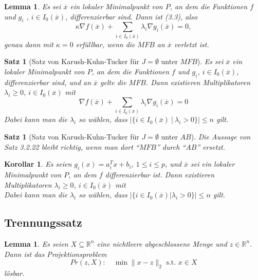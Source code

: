 \documentclass[11pt]{scrreprt}
\newcounter{thm}
\theoremstyle{thmstyle}
\numberwithin{thm}{section}
\newtheorem{korollar}[thm]{Korollar}
\newtheorem{lemma}[thm]{Lemma}
\newtheorem{satz}[thm]{Satz}
\begin{document}
\setcounter{thm}{20}

\begin{lemma}
	Es sei $\overline{x}$ ein lokaler Minimalpunkt von $P$, an dem die Funktionen $f$ und $g_i$ , $i \in I_0(\overline{x})$, differenzierbar sind. Dann ist (3.3), also
	$$ \kappa \nabla f(\overline{x}) + \sum_{i \in I_0(\overline{x})} \lambda_i \nabla g_i(\overline{x}) = 0, $$
	 genau dann mit $\kappa = 0$ erfüllbar, wenn die $MFB$ an $\overline{x}$ verletzt ist.
\end{lemma}

\begin{satz}[Satz von Karush-Kuhn-Tucker für $J = \emptyset$ unter $MFB$] 
	Es sei $\overline{x}$ ein lokaler Minimalpunkt von $P$, an dem die Funktionen $f$ und $g_i$, $i \in I_0(\overline{x})$, differenzierbar sind, und an $\overline{x}$ gelte die $MFB$. Dann existieren Multiplikatoren $\lambda_i \geq 0$, $i \in I_0(\overline{x})$ mit
	  $$ \nabla f(\overline{x}) + \sum_{i \in I_0(\overline{x})} \lambda_i \nabla g_i(\overline{x}) = 0 $$
	Dabei kann man die $\lambda_i$ so wählen, dass $|\{ i \in I_0 (\overline{x}) ~|~\lambda_i > 0 \}| \leq n$ gilt.
\end{satz}

\begin{satz}[Satz von Karush-Kuhn-Tucker für $J = \emptyset$ unter $AB$]
	Die Aussage von Satz 3.2.22 bleibt richtig, wenn man dort \enquote{$MFB$} durch \enquote{$AB$} ersetzt.
\end{satz}

\begin{korollar}
	Es seien $g_i(x) = a_i^T x + b_i$, $1 \leq i \leq p$, und $\overline{x}$ sei ein lokaler Minimalpunkt von $P$, an dem $f$ differenzierbar ist. Dann existieren Multiplikatoren $\lambda_i \geq 0$, $i \in I_0(\overline{x})$ mit
	$$  $$
	Dabei kann man die $\lambda_i$ so wählen, dass $|\{ i \in I_0(\overline{x})| \lambda_i > 0 \}| \leq n$ gilt.
\end{korollar}
 
\subsection*{Trennungssatz}

\begin{lemma}
	Es seien $X \subseteq \mathbb{R}^n$ eine nichtleere abgeschlossene Menge und $z \in \mathbb{R}^n$. Dann ist das Projektionsproblem 
	$$ Pr(z, X): \quad \min \| x - z \|_2 \text{ s.t. } x \in X $$
	lösbar.
\end{lemma}
\end{document}
